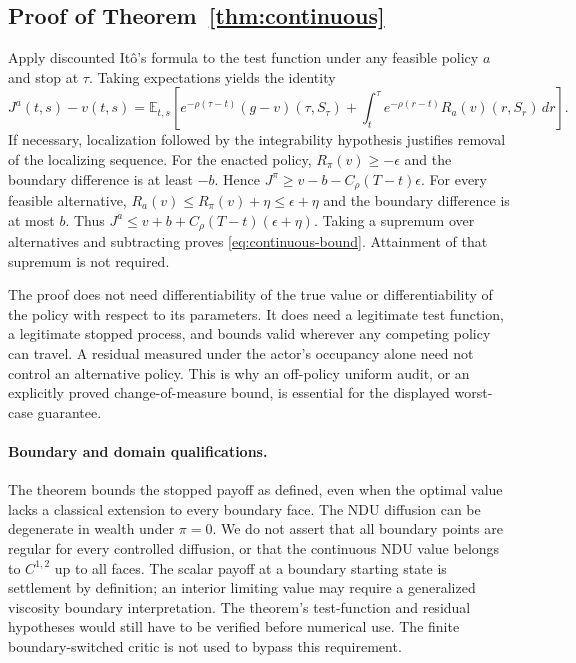 \subsection{Proof of Theorem~\ref{thm:continuous}}
Apply discounted It\^o's formula to the test function under any feasible policy $a$ and stop at $\tau$. Taking expectations yields the identity
\begin{equation}
J^a(t,s)-v(t,s)=\mathbb E_{t,s}\left[e^{-\rho(\tau-t)}(g-v)(\tau,S_\tau)
+\int_t^\tau e^{-\rho(r-t)}R_a(v)(r,S_r)\,dr\right].
\label{eq:ito-identity}
\end{equation}
If necessary, localization followed by the integrability hypothesis justifies removal of the localizing sequence. For the enacted policy, $R_\pi(v)\geq-\epsilon$ and the boundary difference is at least $-b$. Hence
$J^\pi\geq v-b-C_\rho(T-t)\epsilon$. For every feasible alternative,
$R_a(v)\leq R_\pi(v)+\eta\leq\epsilon+\eta$ and the boundary difference is at most $b$. Thus
$J^a\leq v+b+C_\rho(T-t)(\epsilon+\eta)$. Taking a supremum over alternatives and subtracting proves \eqref{eq:continuous-bound}. Attainment of that supremum is not required.

The proof does not need differentiability of the true value or differentiability of the policy with respect to its parameters. It does need a legitimate test function, a legitimate stopped process, and bounds valid wherever any competing policy can travel. A residual measured under the actor's occupancy alone need not control an alternative policy. This is why an off-policy uniform audit, or an explicitly proved change-of-measure bound, is essential for the displayed worst-case guarantee.

\paragraph{Boundary and domain qualifications.}
The theorem bounds the stopped payoff as defined, even when the optimal value lacks a classical extension to every boundary face. The NDU diffusion can be degenerate in wealth under $\pi=0$. We do not assert that all boundary points are regular for every controlled diffusion, or that the continuous NDU value belongs to $C^{1,2}$ up to all faces. The scalar payoff at a boundary starting state is settlement by definition; an interior limiting value may require a generalized viscosity boundary interpretation. The theorem's test-function and residual hypotheses would still have to be verified before numerical use. The finite boundary-switched critic is not used to bypass this requirement.

